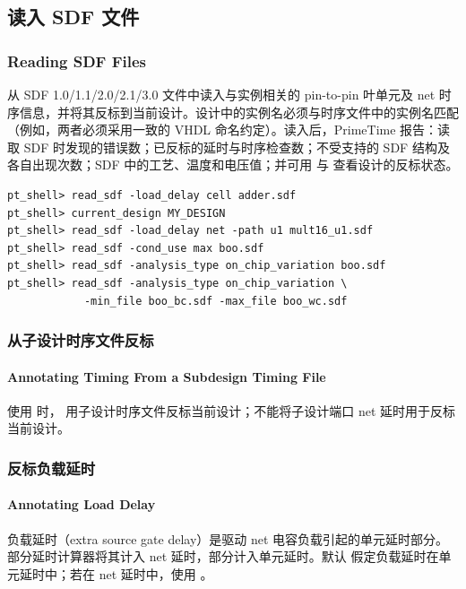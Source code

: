 \subsection{读入 SDF 文件}
\subsubsection*{Reading SDF Files}

 从 SDF 1.0/1.1/2.0/2.1/3.0 文件中读入与实例相关的 pin-to-pin 叶单元及 net 时序信息，并将其反标到当前设计。设计中的实例名必须与时序文件中的实例名匹配（例如，两者必须采用一致的 VHDL 命名约定）。读入后，PrimeTime 报告：读取 SDF 时发现的错误数；已反标的延时与时序检查数；不受支持的 SDF 结构及各自出现次数；SDF 中的工艺、温度和电压值；并可用  与  查看设计的反标状态。

\begin{lstlisting}
pt_shell> read_sdf -load_delay cell adder.sdf
pt_shell> current_design MY_DESIGN
pt_shell> read_sdf -load_delay net -path u1 mult16_u1.sdf
pt_shell> read_sdf -cond_use max boo.sdf
pt_shell> read_sdf -analysis_type on_chip_variation boo.sdf
pt_shell> read_sdf -analysis_type on_chip_variation \
            -min_file boo_bc.sdf -max_file boo_wc.sdf
\end{lstlisting}

\subsubsection{从子设计时序文件反标}
\paragraph*{Annotating Timing From a Subdesign Timing File}

使用  时， 用子设计时序文件反标当前设计；不能将子设计端口 net 延时用于反标当前设计。

\subsubsection{反标负载延时}
\paragraph*{Annotating Load Delay}

负载延时（extra source gate delay）是驱动 net 电容负载引起的单元延时部分。部分延时计算器将其计入 net 延时，部分计入单元延时。默认  假定负载延时在单元延时中；若在 net 延时中，使用 。

